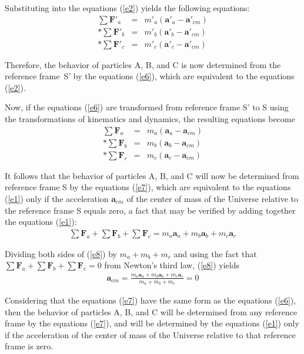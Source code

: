 \documentclass[12pt]{article}
\newcommand{\yN}{\newpage}%
\newcommand{\vA}{\mathbf{a}}
\newcommand{\vF}{\mathbf{F}}
\newcommand{\mM}{m}
\newcommand{\rt}{'}
\newcommand{\ra}{_a}
\newcommand{\rb}{_b}
\newcommand{\rc}{_c}
\newcommand{\rcm}{_{cm}}
\begin{document}
\yN \baselineskip=14.5pt \enlargethispage{0em}

\par Substituting into the equations (\ref{e2}) yields the following equations:
\begin{eqnarray}
\sum \vF\rt\ra & = & \mM\rt\ra(\vA\rt\ra - \vA\rt\rcm) \nonumber \\*
\sum \vF\rt\rb & = & \mM\rt\rb(\vA\rt\rb - \vA\rt\rcm) \label{e6} \\*
\sum \vF\rt\rc & = & \mM\rt\rc(\vA\rt\rc - \vA\rt\rcm) \nonumber
\end{eqnarray}
\par Therefore, the behavior of particles A, B, and C is now determined from the reference \hbox {frame S'} by the equations (\ref{e6}), which are equivalent to the equations (\ref{e2}).
\par Now, if the equations (\ref{e6}) are transformed from reference frame S' to S using the transformations of kinematics and dynamics, the resulting equations become
\begin{eqnarray}
\sum \vF\ra & = & \mM\ra(\vA\ra - \vA\rcm) \nonumber \\*
\sum \vF\rb & = & \mM\rb(\vA\rb - \vA\rcm) \label{e7} \\*
\sum \vF\rc & = & \mM\rc(\vA\rc - \vA\rcm) \nonumber
\end{eqnarray}
\par It follows that the behavior of particles A, B, and C will now be determined from reference frame S by the equations (\ref{e7}), which are equivalent to the equations (\ref{e1}) only if the acceleration $\vA\rcm$ of the center of mass of the Universe relative to the reference frame S equals zero, a fact that may be verified by adding together the equations (\ref{e1}):
\begin{eqnarray}
\sum \vF\ra + \sum \vF\rb + \sum \vF\rc = \mM\ra\vA\ra + \mM\rb\vA\rb + \mM\rc\vA\rc \label{e8}
\end{eqnarray}
\par Dividing both sides of (\ref{e8}) by $\mM\ra + \mM\rb + \mM\rc$ and using the fact that $\sum \vF\ra + \sum \vF\rb + \sum \vF\rc = 0$ from Newton's third law, (\ref{e8}) yields
\begin{eqnarray}
\vA\rcm = \frac{\mM\ra\vA\ra + \mM\rb\vA\rb + \mM\rc\vA\rc}{\mM\ra + \mM\rb + \mM\rc} = 0 \label{e9}
\end{eqnarray}
\par Considering that the equations (\ref{e7}) have the same form as the equations (\ref{e6}), then the behavior of particles A, B, and C will be determined from any reference frame by the equations (\ref{e7}), and will be determined by the equations (\ref{e1}) only if the acceleration of the center of mass of the Universe relative to that reference frame is zero.
\end{document}
